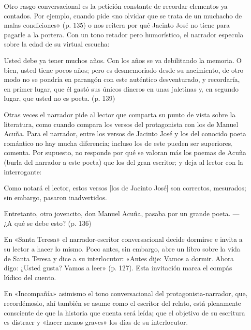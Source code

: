 \documentclass[14pt,twoside,final]{extbook} %
\begin{document}
Otro rasgo conversacional es la petición constante de recordar elementos ya contados. Por ejemplo, cuando pide «no olvidar que se trata de un muchacho de malas condiciones» (p. 135) o nos reitera por qué Jacinto José no tiene para pagarle a la portera. Con un tono retador pero humorístico, el narrador especula sobre la edad de su virtual escucha:
\begin{quoting}
Usted debe ya tener muchos años. Con los años se va debilitando la memoria. O bien, usted tiene pocos años; pero es desmemoriado desde su nacimiento, de otro modo no se pondría en parangón con este auténtico desventurado, y recordaría, en primer lugar, que él gastó sus únicos dineros en unas jaletinas y, en segundo lugar, que usted no es poeta. (p. 139)
\end{quoting}
Otras veces el narrador pide al lector que comparta su punto de vista sobre la literatura, como cuando compara los versos del protagonista con los de Manuel Acuña. Para el narrador, entre los versos de Jacinto José y los del conocido poeta romántico no hay mucha diferencia; incluso los de este pueden ser superiores, comenta. Por supuesto, no responde por qué se valoran más los poemas de Acuña (burla del narrador a este poeta) que los del gran escritor; y deja al lector con la interrogante:
\begin{quoting}
Como notará el lector, estos versos [los de Jacinto José] son correctos, mesurados; sin embargo, pasaron inadvertidos.

Entretanto, otro jovencito, don Manuel Acuña, pasaba por un grande poeta. ---¿A qué se debe esto? (p. 136)
\end{quoting}
En «Santa Teresa» el narrador-escritor conversacional decide dormirse e invita a su lector a hacer lo mismo. Poco antes, sin embargo, abre un libro sobre la vida de Santa Teresa y dice a su interlocutor: «Antes dije: Vamos a dormir. Ahora digo: ¿Usted gusta? Vamos a leer» (p. 127). Esta invitación marca el compás lúdico del cuento.

En «Incompañía» asimismo el tono conversacional del protagonista-narrador, que, recordémoslo, ahí también se asume como el escritor del relato, está plenamente consciente de que la historia que cuenta será leída; que el objetivo de su escritura es distraer y «hacer menos graves» los días de su interlocutor.
\end{document}

